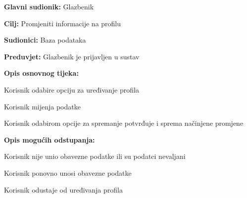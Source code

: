 	\noindent {}
	\begin{packed_item}
		
		\item \textbf{Glavni sudionik: } Glazbenik
		\item  \textbf{Cilj:} Promjeniti informacije na profilu
		\item  \textbf{Sudionici:} Baza podataka
		\item  \textbf{Preduvjet:} Glazbenik je prijavljen u sustav
		\item  \textbf{Opis osnovnog tijeka:}
		
		\item[] \begin{packed_enum}
			
			\item Korisnik odabire opciju za uređivanje profila 
			\item Korisnik mijenja podatke
			\item Korisnik odabirom opcije za spremanje potvrđuje i sprema načinjene promjene
		\end{packed_enum}
		\item  \textbf{Opis mogućih odstupanja:}
		
		\item[] \begin{packed_item}
			
			\item[3.a] Korisnik nije unio obavezne podatke ili su podatci nevaljani
			\item[] \begin{packed_enum}
				
				\item Korisnik ponovno unosi obavezne podatke
				\item Korisnik odustaje od uređivanja profila
				
			\end{packed_enum}
			
		\end{packed_item}
	\end{packed_item}
	
